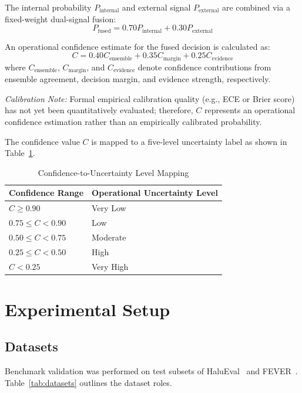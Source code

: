 \documentclass[conference]{IEEEtran}
\begin{document}
The internal probability $P_{\text{internal}}$ and external signal $P_{\text{external}}$ are combined via a fixed-weight dual-signal fusion:
\begin{equation}
P_{\text{fused}} = 0.70 P_{\text{internal}} + 0.30 P_{\text{external}}
\end{equation}

An operational confidence estimate for the fused decision is calculated as:
\begin{equation}
C = 0.40 C_{\text{ensemble}} + 0.35 C_{\text{margin}} + 0.25 C_{\text{evidence}}
\end{equation}
where $C_{\text{ensemble}}$, $C_{\text{margin}}$, and $C_{\text{evidence}}$ denote confidence contributions from ensemble agreement, decision margin, and evidence strength, respectively. 

\textit{Calibration Note:} Formal empirical calibration quality (e.g., ECE or Brier score) has not yet been quantitatively evaluated; therefore, $C$ represents an operational confidence estimation rather than an empirically calibrated probability.

The confidence value $C$ is mapped to a five-level uncertainty label as shown in Table~\ref{tab:confidence_mapping}.

\begin{table}[htbp]
\caption{Confidence-to-Uncertainty Level Mapping}
\begin{center}
\begin{tabular}{ll}
\toprule
\textbf{Confidence Range} & \textbf{Operational Uncertainty Level} \\
\midrule
$C \ge 0.90$ & Very Low \\
$0.75 \le C < 0.90$ & Low \\
$0.50 \le C < 0.75$ & Moderate \\
$0.25 \le C < 0.50$ & High \\
$C < 0.25$ & Very High \\
\bottomrule
\end{tabular}
\label{tab:confidence_mapping}
\end{center}
\end{table}

\section{Experimental Setup}

\subsection{Datasets}
Benchmark validation was performed on test subsets of HaluEval~\cite{li2023halueval} and FEVER~\cite{thorne2018fever}. Table~\ref{tab:datasets} outlines the dataset roles.
\end{document}
